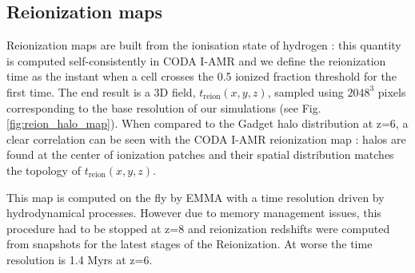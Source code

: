 \documentclass[twocolumn]{aastex61}
\newcommand{\dom}[1]{{#1}}
\begin{document}


\subsection{Reionization maps}
Reionization maps are built from the ionisation state of  hydrogen : this quantity is computed self-consistently in CODA I-AMR and we define the reionization time as the  instant when a cell crosses  the 0.5 ionized fraction threshold for the first time.  The end result is a 3D field, $t_\mathrm{reion}(x,y,z)$, sampled using $2048^3$ pixels corresponding to the base resolution of our simulations (see Fig. \ref{fig:reion_halo_map}). When compared to the Gadget halo distribution at z=6,  a clear correlation can be seen with the CODA I-AMR reionization map : \dom{halos are found at the center of ionization patches and their spatial distribution matches the topology of $t_\mathrm{reion}(x,y,z)$}.

This map is computed on the fly by EMMA with a time resolution driven by hydrodynamical processes. However due  to memory management issues, this procedure had to be stopped at z=8 and reionization redshifts were computed from snapshots for the latest stages of the Reionization. At worse the time resolution is 1.4 Myrs at z=6.

\end{document}
